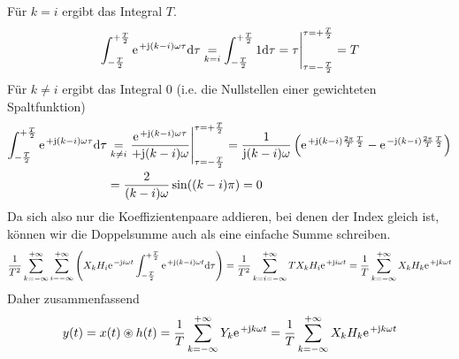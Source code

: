 \documentclass[11pt,a4paper,DIV=12]{scrartcl}
\newcommand{\diff}{\mathrm{d}}
\begin{document}
Für $k=i$ ergibt das Integral $T$.
%
%
\begin{align}
	\int_{-\frac{T}{2}}^{+\frac{T}{2}}\e^{+\im (k-i)\omega \tau}\diff \tau \underset{k=i}{=}\int_{-\frac{T}{2}}^{+\frac{T}{2}}1\diff \tau =\tau \Bigg |_{\tau=-\frac{T}{2}}^{\tau=+\frac{T}{2}}=T
\end{align}
%
%
Für $k\neq i$ ergibt das Integral $0$ (i.e. die Nullstellen einer gewichteten Spaltfunktion)
%
%
\begin{align}
	\int_{-\frac{T}{2}}^{+\frac{T}{2}}\e^{+\im (k-i)\omega \tau}\diff \tau &\underset{k\neq i}{=}\frac{\e^{+\im (k-i)\omega \tau}}{+\im (k-i)\omega}\Bigg |_{\tau=-\frac{T}{2}}^{\tau=+\frac{T}{2}}
	=\frac{1}{\im (k-i)\omega }\left (\e^{+\im (k-i)\frac{2\pi}{T}\frac{T}{2}}-\e^{-\im (k-i)\frac{2\pi}{T}\frac{T}{2}}\right )\nonumber \\
	&=\frac{2}{ (k-i)\omega}\sin((k-i)\pi)=0
\end{align}
%
Da sich also nur die Koeffizientenpaare addieren, bei denen der Index gleich ist, können wir die Doppelsumme auch als eine einfache Summe schreiben.
%
%
\begin{align}
	\frac{1}{T^2}\sum_{k=-\infty}^{+\infty}\sum_{i=-\infty}^{+\infty}\left (X_kH_i\e^{-\im i \omega t}\int_{-\frac{T}{2}}^{+\frac{T}{2}}\e^{+\im (k-i)\omega t}\diff \tau \right )
	=\frac{1}{T^2}\sum_{k=i=-\infty}^{+\infty}TX_kH_i\e^{+\im i\omega t}
	=\frac{1}{T}\sum_{k=-\infty}^{+\infty}X_kH_k\e^{+\im k \omega t}
\end{align}
%
Daher zusammenfassend
\begin{align}
y(t) = x(t)\circledast h(t) = \frac{1}{T}\sum_{k=-\infty}^{+\infty} Y_k \e^{+\im k \omega t} = \frac{1}{T}\sum_{k=-\infty}^{+\infty}X_kH_k\e^{+\im k \omega t}
\end{align}
\end{document}
